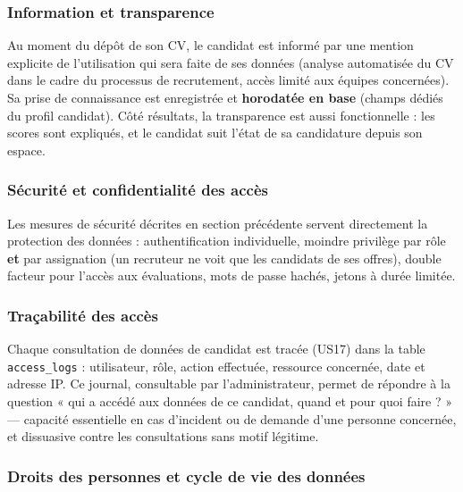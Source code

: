 \documentclass[12pt,a4paper]{report}
\begin{document}
\subsubsection{Information et transparence}

Au moment du dépôt de son CV, le candidat est informé par une mention explicite de l'utilisation qui sera faite de ses données (analyse automatisée du CV dans le cadre du processus de recrutement, accès limité aux équipes concernées). Sa prise de connaissance est enregistrée et \textbf{horodatée en base} (champs dédiés du profil candidat). Côté résultats, la transparence est aussi fonctionnelle : les scores sont expliqués, et le candidat suit l'état de sa candidature depuis son espace.

\subsubsection{Sécurité et confidentialité des accès}

Les mesures de sécurité décrites en section précédente servent directement la protection des données : authentification individuelle, moindre privilège par rôle \textbf{et} par assignation (un recruteur ne voit que les candidats de ses offres), double facteur pour l'accès aux évaluations, mots de passe hachés, jetons à durée limitée.

\subsubsection{Traçabilité des accès}

Chaque consultation de données de candidat est tracée (US17) dans la table \texttt{access\_logs} : utilisateur, rôle, action effectuée, ressource concernée, date et adresse IP. Ce journal, consultable par l'administrateur, permet de répondre à la question « qui a accédé aux données de ce candidat, quand et pour quoi faire ? » --- capacité essentielle en cas d'incident ou de demande d'une personne concernée, et dissuasive contre les consultations sans motif légitime.

\subsubsection{Droits des personnes et cycle de vie des données}
\end{document}
